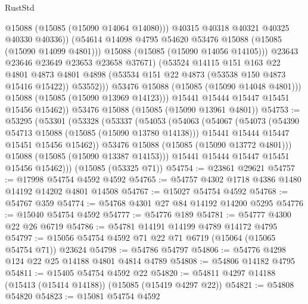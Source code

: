 \begin{lexlean}{RustStd}
\begin{coremodule}
                          @15088
                          (@15085 (@15090 @14064 @14080)))
                        @40315
                        @40318
                        @40321
                        @40325
                        @40330
                        @40336))
                    (@54614 @14098 @4795 @54620 @53476 @15088 (@15085 (@15090 @14099 @4801)))
                    @15088
                    (@15085 (@15090 @14056 @14105)))
                  @23643
                  @23646
                  @23649
                  @23653
                  @23658
                  @37671)
                (@53524
                  @14115
                  @151
                  @163
                  @22
                  @4801
                  @4873
                  @4801
                  @4898
                  (@53534 @151 @22 @4873 (@53538 @150 @4873 @15416 @15422))
                  @53552)))
            @53476
            @15088
            (@15085 (@15090 @14048 @4801)))
          @15088
          (@15085 (@15090 @13969 @14123)))
        @15441
        @15444
        @15447
        @15451
        @15456
        @15462))
    @53476
    @15088
    (@15085 (@15090 @13961 @4801))
@54753 := @53295
    (@53301
      (@53328
        (@53337
          (@54053
            (@54063
              (@54067
                (@54073
                  (@54390 @54713 @15088 (@15085 (@15090 @13780 @14138)))
                  @15441
                  @15444
                  @15447
                  @15451
                  @15456
                  @15462))
              @53476
              @15088
              (@15085 (@15090 @13772 @4801)))
            @15088
            (@15085 (@15090 @13387 @14153)))
          @15441
          @15444
          @15447
          @15451
          @15456
          @15462)))
    (@15085 (@53325 @71))
@54754 := @23861 @29621
@54757 := @17998 @54754 @4592 @4592
@54765 := @54757 @4302 @1718 @4386 @1480 @14192 @14202 @4801 @14508
@54767 := @15027 @54754 @4592
@54768 := @54767 @359
@54774 := @54768 @4301 @27 @84 @14192 @14200 @5295
@54776 := @15040 @54754 @4592
@54777 := @54776 @189
@54781 := @54777 @4300 @22 @26 @6719
@54786 := @54781 @14191 @14199 @4789 @14172 @4795
@54797 := @15056 @54754 @4592 @71 @22 @71 @6719 (@15064 (@15065 @54754 @71)) @23624
@54798 := @54786 @54797
@54806 := @54776 @4298 @124 @22 @25 @14188 @4801 @4814 @4789
@54808 := @54806 @14182 @4795
@54811 := @15405 @54754 @4592 @22
@54820 := @54811 @4297 @14188 (@15413 (@15414 @14188)) (@15085 (@15419 @4297 @22))
@54821 := @54808 @54820
@54823 := @15081 @54754 @4592

\end{coremodule}
\end{lexlean}
